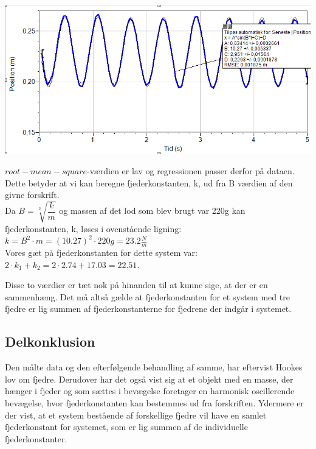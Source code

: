 \begin{center}
\includegraphics[scale=0.7]{Billeder/graf4}
\end{center}

$root-mean-square$-værdien er lav og regressionen passer derfor på dataen. Dette betyder at vi kan beregne fjederkonstanten, k, ud fra B værdien af den givne forskrift.
\\

Da $B=\sqrt[2]{\dfrac{k}{m}}$ og massen af det lod som blev brugt var 220g kan fjederkonstanten, k, løses i ovenstående ligning:
\\

$k=B^2 \cdot m = (10.27)^2 \cdot 220g = 23.2 \frac{N}{m}$
\\

Vores gæt på fjederkonstanten for dette system var: $2 \cdot k_1 + k_2 = 2 \cdot 2.74 + 17.03 = 22.51$. 

Disse to værdier er tæt nok på hinanden til at kunne sige, at der er en sammenhæng. Det må altså gælde at fjederkonstanten for et system med tre fjedre er lig summen af fjederkonstanterne for fjedrene der indgår i systemet. 
\\

\subsection{Delkonklusion}\label{sec:del}
Den målte data og den efterfølgende behandling af samme, har eftervist Hookes lov om fjedre. Derudover har det også vist sig at et objekt med en masse, der hænger i fjeder og som sættes i bevægelse foretager en harmonisk oscillerende bevægelse, hvor fjederkonstanten kan bestemmes ud fra forskriften. Ydermere er der vist, at et system bestående af forskellige fjedre vil have en samlet fjederkonstant for systemet, som er lig summen af de individuelle fjederkonstanter.